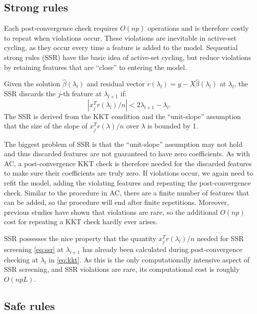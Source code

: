 \subsection{Strong rules}

Each post-convergence check requires $O(np)$ operations and is therefore costly to repeat when violations occur.  These violations are inevitable in active-set cycling, as they occur every time a feature is added to the model.  Sequential strong rules (SSR) \citep{tibshirani2011regression} have the basic idea of active-set cycling, but reduce violations by retaining features that are ``close'' to entering the model.

Given the solution $\hat{\beta}(\lambda_l)$ and residual vector $r(\lambda_l)=y-X\hat{\beta}(\lambda_l)$ at $\lambda_l$, the SSR discards the $j$-th feature at $\lambda_{l+1}$ if:
\begin{equation}
  \label{eq:ssr}
  |x_j^Tr(\lambda_l)/n|<2\lambda_{l+1}-\lambda_l.
\end{equation}
The SSR is derived from the KKT condition and the ``unit-slope'' assumption that the size of the slope of $x_j^Tr(\lambda)/n$ over $\lambda$ is bounded by 1. 

The biggest problem of SSR is that the ``unit-slope'' assumption may not hold and thus discarded features are not guaranteed to have zero coefficients. As with AC, a post-convergence KKT check is therefore needed for the discarded features to make sure their coefficients are truly zero. If violations occur, we again need to refit the model, adding the violating features and repeating the post-convergence check. Similar to the procedure in AC, there are a finite number of features that can be added, so the procedure will end after finite repetitions. Moreover, previous studies have shown that violations are rare, so the additional $O(np)$ cost for repeating a KKT check hardly ever arises.

SSR possesses the nice property that the quantity $x_j^Tr(\lambda_l)/n$ needed for SSR screening \eqref{eq:ssr} at $\lambda_{l+1}$ has already been calculated during post-convergence checking at $\lambda_l$ in \eqref{eq:kkt}. As this is the only computationally intensive aspect of SSR screening, and SSR violations are rare, its computational cost is roughly $O(npL)$.

\subsection{Safe rules}
\label{sec:safe}

